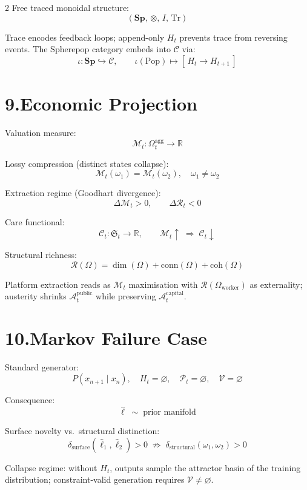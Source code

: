 \documentclass[10pt,a4paper]{article}
\theoremstyle{plain}
\theoremstyle{remark}
\newcommand{\A}{\mathcal{A}}
\newcommand{\C}{\mathcal{C}}
\newcommand{\M}{\mathcal{M}}
\newcommand{\Pp}{\mathcal{P}}
\newcommand{\Rr}{\mathcal{R}}
\newcommand{\KES}{\mathfrak{S}}
\begin{document}
\begin{multicols}{2}
Free traced monoidal structure:
\[
(\mathbf{Sp},\,\otimes,\,I,\,\mathrm{Tr})
\]

Trace encodes feedback loops; append-only $H_t$ prevents trace from
reversing events. The Spherepop category embeds into $\C$ via:
\[
\iota:\mathbf{Sp}\hookrightarrow\C,
\qquad
\iota(\mathrm{Pop})\mapsto [\,H_t\to H_{t+1}\,]
\]

\section*{9.\enspace Economic Projection}

Valuation measure:
\[
\M_t:\Omega_t^{\mathrm{agg}}
\to
\mathbb{R}
\]

Lossy compression (distinct states collapse):
\[
\M_t(\omega_1)
=
\M_t(\omega_2),
\quad
\omega_1\neq\omega_2
\]

Extraction regime (Goodhart divergence):
\[
\Delta\M_t >0,
\qquad
\Delta\Rr_t<0
\]

Care functional:
\[
\mathcal{C}_t:
\KES_t\to\mathbb{R},
\qquad
\M_t \uparrow
\;\Rightarrow\;
\mathcal{C}_t \downarrow
\]

Structural richness:
\[
\Rr(\Omega)
=
\dim(\Omega)
+
\mathrm{conn}(\Omega)
+
\mathrm{coh}(\Omega)
\]

Platform extraction reads as $\M_t$ maximisation with
$\Rr(\Omega_{\mathrm{worker}})$ as externality; austerity shrinks
$\A_t^{\mathrm{public}}$ while preserving $\A_t^{\mathrm{capital}}$.

\section*{10.\enspace Markov Failure Case}

Standard generator:
\[
P(x_{n+1}\mid x_n),
\quad
H_t = \varnothing,
\quad
\Pp_t = \varnothing,
\quad
\mathcal{V} = \varnothing
\]

Consequence:
\[
\hat{\ell}
\;\sim\;
\text{prior manifold}
\]

Surface novelty vs.\ structural distinction:
\[
\delta_{\mathrm{surface}}(\hat{\ell}_1,\hat{\ell}_2) > 0
\;\not\Rightarrow\;
\delta_{\mathrm{structural}}(\omega_1,\omega_2) > 0
\]

Collapse regime: without $H_t$, outputs sample the attractor basin of the
training distribution; constraint-valid generation requires $\mathcal{V}\neq\varnothing$.


\end{multicols}
\end{document}
